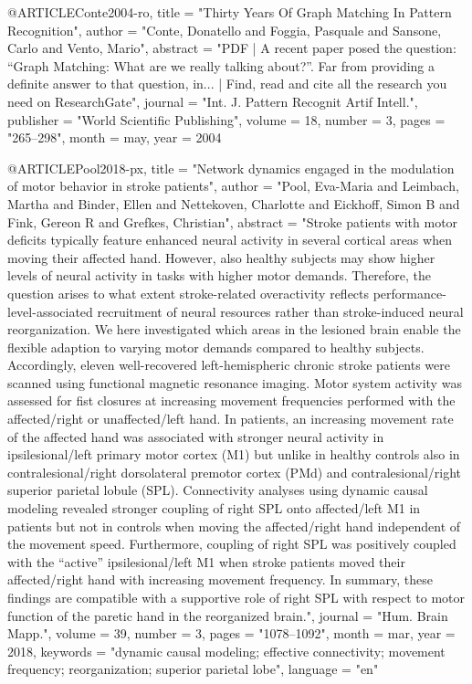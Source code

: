 @ARTICLE{Conte2004-ro,
	title     = "Thirty Years Of Graph Matching In Pattern Recognition",
	author    = "Conte, Donatello and Foggia, Pasquale and Sansone, Carlo and
	Vento, Mario",
	abstract  = "PDF | A recent paper posed the question: ``Graph Matching: What
	are we really talking about?''. Far from providing a definite
	answer to that question, in... | Find, read and cite all the
	research you need on ResearchGate",
	journal   = "Int. J. Pattern Recognit Artif Intell.",
	publisher = "World Scientific Publishing",
	volume    =  18,
	number    =  3,
	pages     = "265--298",
	month     =  may,
	year      =  2004
}

@ARTICLE{Pool2018-px,
	title    = "Network dynamics engaged in the modulation of motor behavior in
	stroke patients",
	author   = "Pool, Eva-Maria and Leimbach, Martha and Binder, Ellen and
	Nettekoven, Charlotte and Eickhoff, Simon B and Fink, Gereon R
	and Grefkes, Christian",
	abstract = "Stroke patients with motor deficits typically feature enhanced
	neural activity in several cortical areas when moving their
	affected hand. However, also healthy subjects may show higher
	levels of neural activity in tasks with higher motor demands.
	Therefore, the question arises to what extent stroke-related
	overactivity reflects performance-level-associated recruitment of
	neural resources rather than stroke-induced neural
	reorganization. We here investigated which areas in the lesioned
	brain enable the flexible adaption to varying motor demands
	compared to healthy subjects. Accordingly, eleven well-recovered
	left-hemispheric chronic stroke patients were scanned using
	functional magnetic resonance imaging. Motor system activity was
	assessed for fist closures at increasing movement frequencies
	performed with the affected/right or unaffected/left hand. In
	patients, an increasing movement rate of the affected hand was
	associated with stronger neural activity in ipsilesional/left
	primary motor cortex (M1) but unlike in healthy controls also in
	contralesional/right dorsolateral premotor cortex (PMd) and
	contralesional/right superior parietal lobule (SPL). Connectivity
	analyses using dynamic causal modeling revealed stronger coupling
	of right SPL onto affected/left M1 in patients but not in
	controls when moving the affected/right hand independent of the
	movement speed. Furthermore, coupling of right SPL was positively
	coupled with the ``active'' ipsilesional/left M1 when stroke
	patients moved their affected/right hand with increasing movement
	frequency. In summary, these findings are compatible with a
	supportive role of right SPL with respect to motor function of
	the paretic hand in the reorganized brain.",
	journal  = "Hum. Brain Mapp.",
	volume   =  39,
	number   =  3,
	pages    = "1078--1092",
	month    =  mar,
	year     =  2018,
	keywords = "dynamic causal modeling; effective connectivity; movement
	frequency; reorganization; superior parietal lobe",
	language = "en"
}

